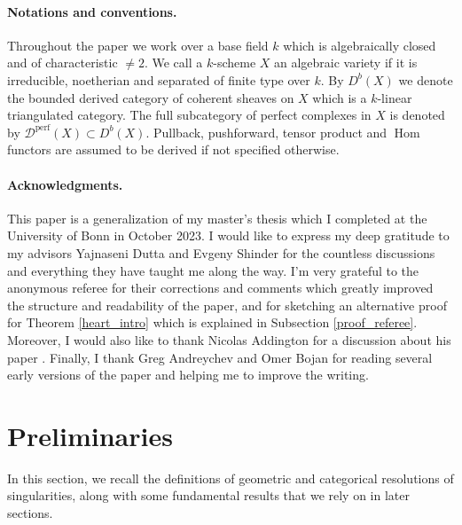 \documentclass[a4paper, twoside, 11pt]{amsart}
\theoremstyle{definition}
\theoremstyle{remark}
\numberwithin{equation}{theorem}
\DeclareMathOperator{\Hom}{Hom}
\newcommand{\dbx}{D^b(X)}
\newcommand{\perf}{\mathcal{D}^{\text{perf}}}
\begin{document}
\paragraph{\textbf{Notations and conventions.}}
Throughout the paper we work over a base field $k$ which is algebraically closed and of characteristic $\neq 2$. We call a $k$-scheme $X$ an algebraic variety if it is irreducible, noetherian and separated of finite type over $k$. By $\dbx$ we denote the bounded derived category of coherent sheaves on $X$ which is a $k$-linear triangulated category. The full subcategory of perfect complexes in $X$ is denoted by $\perf(X) \subset \dbx$. Pullback, pushforward, tensor product and $\Hom$ functors are assumed to be derived if not specified otherwise. \\
\paragraph{\textbf{Acknowledgments.}}
This paper is a generalization of my master's thesis which I completed at the University of Bonn in October 2023. I would like to express my deep gratitude to my advisors Yajnaseni Dutta and Evgeny Shinder for the countless discussions and everything they have taught me along the way. I'm very grateful to the anonymous referee for their corrections and comments which greatly improved the structure and readability of the paper, and for sketching an alternative proof for Theorem \ref{heart_intro} which is explained in Subsection \ref{proof_referee}. Moreover, I would also like to thank Nicolas Addington for a discussion about his paper \cite{Addington}. Finally, I thank Greg Andreychev and Omer Bojan for reading several early versions of the paper and helping me to improve the writing. 
\newpage 


\section{Preliminaries}\label{prelim}
In this section, we recall the definitions of geometric and categorical resolutions of singularities, along with some fundamental results that we rely on in later sections.
\end{document}
